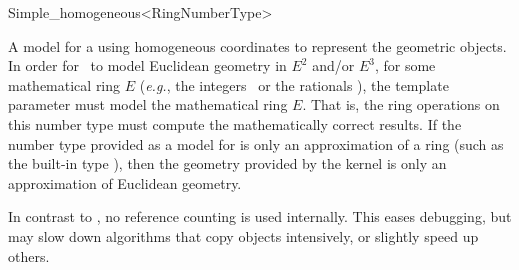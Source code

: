 \begin{ccRefClass}{Simple_homogeneous<RingNumberType>}

\ccDefinition
A model for a  using homogeneous coordinates to represent the
geometric objects. In order for \ccRefName\ to model Euclidean geometry
in $E^2$ and/or $E^3$, for some mathematical ring $E$ (\textit{e.g.},
the integers \Z\ or the rationals \Q), the template parameter 
must model the mathematical ring $E$.  That is, the ring operations on this
number type must compute the mathematically correct results.  If the number
type provided as a model for  is only an approximation of a
ring (such as the built-in type ), then the geometry provided by
the kernel is only an approximation of Euclidean geometry.



\ccIsModel
{}

\ccTypes
{}
\ccGlue
{}

\ccImplementation In contrast to , no reference counting
is used internally. This eases debugging, but may slow down algorithms
that copy objects intensively, or slightly speed up others.

\ccSeeAlso
{} \\
 \\
 \\
\end{ccRefClass}
